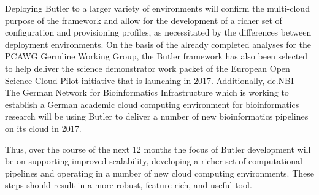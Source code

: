 Deploying Butler to a larger variety of environments will confirm the multi-cloud purpose of the framework and allow for the development of a richer set of configuration and provisioning profiles, as necessitated by the differences between deployment environments. On the basis of the already completed analyses for the PCAWG Germline Working Group, the Butler framework has also been selected to help deliver the science demonstrator work packet of the European Open Science Cloud Pilot\autocite{European_Open_Science_Cloud_2016} initiative that is launching in 2017. Additionally, de.NBI - The German Network for Bioinformatics Infrastructure\autocite{denbi_2016-10-31} which is working to establish a German academic cloud computing environment for bioinformatics research will be using Butler to deliver a number of new bioinformatics pipelines on its cloud in 2017.

Thus, over the course of the next 12 months the focus of Butler development will be on supporting improved scalability, developing a richer set of computational pipelines and operating in a number of new cloud computing environments. These steps should result in a more robust, feature rich, and useful tool.

  




